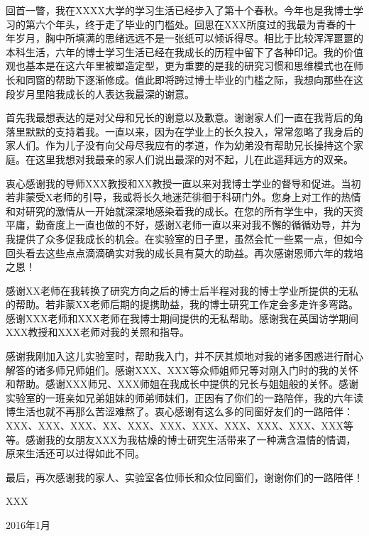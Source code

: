 
回首一瞥，我在XXXX大学的学习生活已经步入了第十个春秋。今年也是我博士学习的第六个年头，终于走了毕业的门槛处。回思在XXX所度过的我最为青春的十年岁月，胸中所填满的思绪远远不是一张纸可以倾诉得尽。相比于比较浑浑噩噩的本科生活，六年的博士学习生活已经在我成长的历程中留下了各种印记。我的价值观也基本是在这六年里被塑造定型，更为重要的是我的研究习惯和思维模式也在师长和同窗的帮助下逐渐修成。值此即将跨过博士毕业的门槛之际，我想向那些在这段岁月里陪我成长的人表达我最深的谢意。

首先我最想表达的是对父母和兄长的谢意以及歉意。谢谢家人们一直在我背后的角落里默默的支持着我。一直以来，因为在学业上的长久投入，常常忽略了我身后的家人们。作为儿子没有向父母尽我应有的孝道，作为幼弟没有帮助兄长操持这个家庭。在这里我想对我最亲的家人们说出最深的对不起，儿在此遥拜远方的双亲。

衷心感谢我的导师XXX教授和XX教授一直以来对我博士学业的督导和促进。当初若非蒙受X老师的引导，我或将长久地迷茫徘徊于科研门外。您身上对工作的热情和对研究的激情从一开始就深深地感染着我的成长。在您的所有学生中，我的天资平庸，勤奋度上一直也做的不好，感谢X老师一直以来对我不懈的循循劝导，并为我提供了众多促我成长的机会。在实验室的日子里，虽然会忙一些累一点，但如今回头看去这些点点滴滴确实对我的成长具有莫大的助益。再次感谢恩师六年的栽培之恩！

感谢XX老师在我转换了研究方向之后的博士后半程对我的博士学业所提供的无私的帮助。若非蒙XX老师后期的提携助益，我的博士研究工作定会多走许多弯路。感谢XXX老师和XXX老师在我博士期间提供的无私帮助。感谢我在英国访学期间XXX教授和XXX老师对我的关照和指导。

感谢我刚加入这儿实验室时，帮助我入门，并不厌其烦地对我的诸多困惑进行耐心解答的诸多师兄师姐们。感谢XXX、XXX等众师姐师兄等对刚入门时的我的关怀和帮助。感谢XXX师兄、XXX师姐在我成长中提供的兄长与姐姐般的关怀。感谢实验室的一班亲如兄弟姐妹的师弟师妹们，正因有了你们的一路陪伴，我的六年读博生活也就不再那么苦涩难熬了。衷心感谢有这么多的同窗好友们的一路陪伴：XXX、XXX、XXX、XX、XXX、XXX、XXX、XXX、XXX、XXX、XXX等等。感谢我的女朋友XXX为我枯燥的博士研究生活带来了一种满含温情的情调，原来生活还可以过得如此不同。

最后，再次感谢我的家人、实验室各位师长和众位同窗们，谢谢你们的一路陪伴！

\quad\quad\quad\quad\quad\quad\quad\quad\quad\quad\quad\quad\quad\quad\quad\quad\quad\quad\quad\quad\quad\quad\quad\quad\quad\quad\quad\quad\quad\quad XXX

\quad\quad\quad\quad\quad\quad\quad\quad\quad\quad\quad\quad\quad\quad\quad\quad\quad\quad\quad\quad\quad\quad\quad\quad\quad\quad\quad\quad\quad 2016年1月




\clearpage\mbox{}

